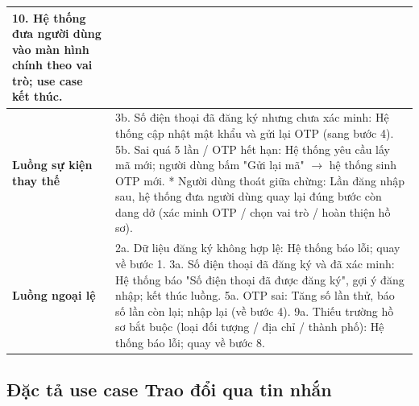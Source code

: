 \documentclass[../main.tex]{subfiles}%
\begin{document}
\begin{longtable}{|p{3.5cm}|p{11.5cm}|}
10. Hệ thống đưa người dùng vào màn hình chính theo vai trò; use case kết thúc. \\ \hline
\textbf{Luồng sự kiện thay thế} &
3b. Số điện thoại đã đăng ký nhưng chưa xác minh: Hệ thống cập nhật mật khẩu và gửi lại OTP (sang bước 4). \newline
5b. Sai quá 5 lần / OTP hết hạn: Hệ thống yêu cầu lấy mã mới; người dùng bấm "Gửi lại mã" $\rightarrow$ hệ thống sinh OTP mới. \newline
* Người dùng thoát giữa chừng: Lần đăng nhập sau, hệ thống đưa người dùng quay lại đúng bước còn dang dở (xác minh OTP / chọn vai trò / hoàn thiện hồ sơ). \\ \hline
\textbf{Luồng ngoại lệ} &
2a. Dữ liệu đăng ký không hợp lệ: Hệ thống báo lỗi; quay về bước 1. \newline
3a. Số điện thoại đã đăng ký và đã xác minh: Hệ thống báo "Số điện thoại đã được đăng ký", gợi ý đăng nhập; kết thúc luồng. \newline
5a. OTP sai: Tăng số lần thử, báo số lần còn lại; nhập lại (về bước 4). \newline
9a. Thiếu trường hồ sơ bắt buộc (loại đối tượng / địa chỉ / thành phố): Hệ thống báo lỗi; quay về bước 8. \\ \hline
\end{longtable}
\endgroup

\subsection{ Đặc tả use case Trao đổi qua tin nhắn}
\label{section:2.4.5}
\end{document}
